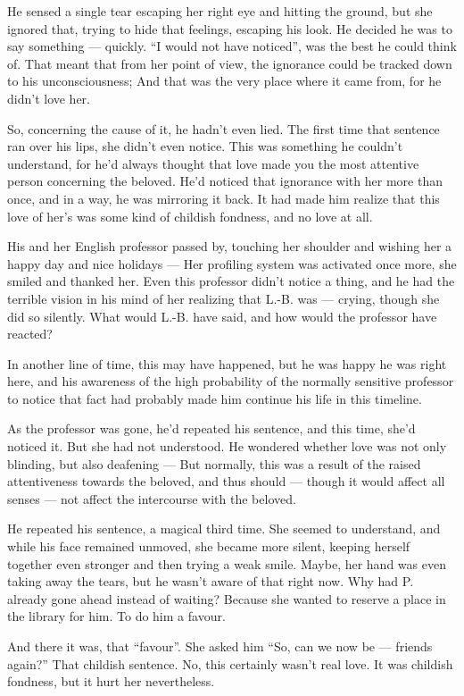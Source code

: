 He sensed a single tear escaping her right eye and hitting the ground, but she ignored that, trying to hide that feelings, escaping his look. 
He decided he was to say something --- quickly. \enquote{I would not have noticed}, was the best he could think of. That meant that from her point of view, the ignorance could be tracked down to his unconsciousness; And that was the very place where it came from, for he didn't love her.

So, concerning the cause of it, he hadn't even lied. The first time that sentence ran over his lips, she didn't even notice. This was something he couldn't understand, for he'd always thought that love made you the most attentive person concerning the beloved. He'd noticed that ignorance with her more than once, and in a way, he was mirroring it back. It had made him realize that this love of her's was some kind of childish fondness, and no love at all.

His and her English professor passed by, touching her shoulder and wishing her a happy day and nice holidays --- Her profiling system was activated once more, she smiled and thanked her. Even this professor didn't notice a thing, and he had the terrible vision in his mind of her realizing that L.-B. was --- crying, though she did so silently. What would L.-B. have said, and how would the professor have reacted?

In another line of time, this may have happened, but he was happy he was right here, and his awareness of the high probability of the normally sensitive professor to notice that fact had probably made him continue his life in this timeline.

As the professor was gone, he'd repeated his sentence, and this time, she'd noticed it. But she had not understood. He wondered whether love was not only blinding, but also deafening --- But normally, this was a result of the raised attentiveness towards the beloved, and thus should --- though it would affect all senses --- not affect the intercourse with the beloved.

He repeated his sentence, a magical third time. She seemed to understand, and while his face remained unmoved, she became more silent, keeping herself together even stronger and then trying a weak smile. Maybe, her hand was even taking away the tears, but he wasn't aware of that right now. Why had P. already gone ahead instead of waiting? Because she wanted to reserve a place in the library for him. To do him a favour.

And there it was, that \enquote{favour}. She asked him \enquote{So, can we now be --- friends again?} That childish sentence. 
No, this certainly wasn't real love. It was childish fondness, but it hurt her nevertheless.

